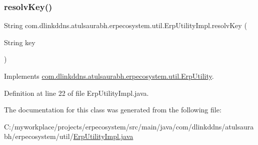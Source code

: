 \subsubsection{\texorpdfstring{resolv\+Key()}{resolvKey()}}
{\footnotesize\ttfamily String com.\+dlinkddns.\+atulsaurabh.\+erpecosystem.\+util.\+Erp\+Utility\+Impl.\+resolv\+Key (\begin{DoxyParamCaption}\item[{String}]{key }\end{DoxyParamCaption})}



Implements \mbox{\hyperlink{interfacecom_1_1dlinkddns_1_1atulsaurabh_1_1erpecosystem_1_1util_1_1_erp_utility_a177b7a6f2a1ab3a9e620ca914ddcd6d9}{com.\+dlinkddns.\+atulsaurabh.\+erpecosystem.\+util.\+Erp\+Utility}}.



Definition at line 22 of file Erp\+Utility\+Impl.\+java.



The documentation for this class was generated from the following file\+:\begin{DoxyCompactItemize}
\item 
C\+:/myworkplace/projects/erpecosystem/src/main/java/com/dlinkddns/atulsaurabh/erpecosystem/util/\mbox{\hyperlink{_erp_utility_impl_8java}{Erp\+Utility\+Impl.\+java}}\end{DoxyCompactItemize}
